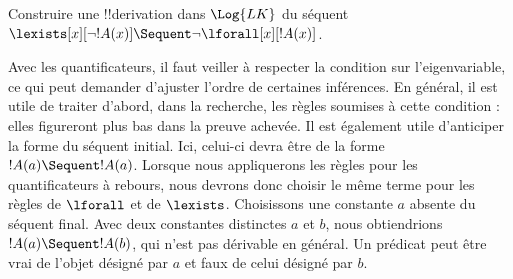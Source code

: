\documentclass[../../../include/open-logic-section]{subfiles}
\begin{document}


\begin{ex}
Construire une !!{derivation} dans $\Log{LK}$ du séquent
$\lexists[x][\lnot !A(x)] \Sequent \lnot \lforall[x][!A(x)]$.

Avec les quantificateurs, il faut veiller à respecter la condition
sur l'eigenvariable, ce qui peut demander d'ajuster l'ordre de certaines
inférences. En général, il est utile de traiter d'abord, dans la
recherche, les règles soumises à cette condition : elles figureront
plus bas dans la preuve achevée. Il est également utile d'anticiper
la forme du séquent initial. Ici, celui-ci devra être de la forme
$!A(a) \Sequent !A(a)$. Lorsque nous appliquerons les règles pour
les quantificateurs à rebours, nous devrons donc choisir le même
terme pour les règles de $\lforall$ et de $\lexists$. Choisissons une
constante $a$ absente du séquent final. Avec deux constantes distinctes
$a$ et $b$, nous obtiendrions $!A(a) \Sequent !A(b)$, qui n'est pas
dérivable en général. Un prédicat peut être vrai de l'objet désigné
par $a$ et faux de celui désigné par $b$.


\end{ex}
\end{document}
